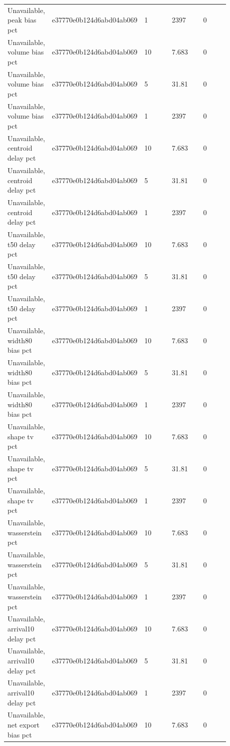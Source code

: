 \begin{longtable}{p{0.1760\linewidth}p{0.1760\linewidth}p{0.1760\linewidth}p{0.1760\linewidth}p{0.1760\linewidth}}
Unavailable, peak bias pct & e37770e0b124d6abd04ab069 & 1 & 2397 & 0 \\
Unavailable, volume bias pct & e37770e0b124d6abd04ab069 & 10 & 7.683 & 0 \\
Unavailable, volume bias pct & e37770e0b124d6abd04ab069 & 5 & 31.81 & 0 \\
Unavailable, volume bias pct & e37770e0b124d6abd04ab069 & 1 & 2397 & 0 \\
Unavailable, centroid delay pct & e37770e0b124d6abd04ab069 & 10 & 7.683 & 0 \\
Unavailable, centroid delay pct & e37770e0b124d6abd04ab069 & 5 & 31.81 & 0 \\
Unavailable, centroid delay pct & e37770e0b124d6abd04ab069 & 1 & 2397 & 0 \\
Unavailable, t50 delay pct & e37770e0b124d6abd04ab069 & 10 & 7.683 & 0 \\
Unavailable, t50 delay pct & e37770e0b124d6abd04ab069 & 5 & 31.81 & 0 \\
Unavailable, t50 delay pct & e37770e0b124d6abd04ab069 & 1 & 2397 & 0 \\
Unavailable, width80 bias pct & e37770e0b124d6abd04ab069 & 10 & 7.683 & 0 \\
Unavailable, width80 bias pct & e37770e0b124d6abd04ab069 & 5 & 31.81 & 0 \\
Unavailable, width80 bias pct & e37770e0b124d6abd04ab069 & 1 & 2397 & 0 \\
Unavailable, shape tv pct & e37770e0b124d6abd04ab069 & 10 & 7.683 & 0 \\
Unavailable, shape tv pct & e37770e0b124d6abd04ab069 & 5 & 31.81 & 0 \\
Unavailable, shape tv pct & e37770e0b124d6abd04ab069 & 1 & 2397 & 0 \\
Unavailable, wasserstein pct & e37770e0b124d6abd04ab069 & 10 & 7.683 & 0 \\
Unavailable, wasserstein pct & e37770e0b124d6abd04ab069 & 5 & 31.81 & 0 \\
Unavailable, wasserstein pct & e37770e0b124d6abd04ab069 & 1 & 2397 & 0 \\
Unavailable, arrival10 delay pct & e37770e0b124d6abd04ab069 & 10 & 7.683 & 0 \\
Unavailable, arrival10 delay pct & e37770e0b124d6abd04ab069 & 5 & 31.81 & 0 \\
Unavailable, arrival10 delay pct & e37770e0b124d6abd04ab069 & 1 & 2397 & 0 \\
Unavailable, net export bias pct & e37770e0b124d6abd04ab069 & 10 & 7.683 & 0 \\

\end{longtable}
